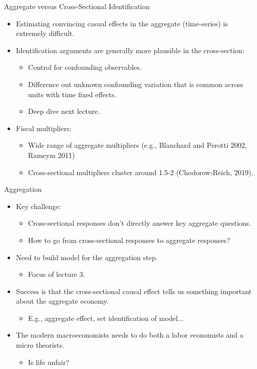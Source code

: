 \documentclass[english,xcolor=svgnames]{beamer}
\begin{document}
\begin{frame}{Aggregate versus Cross-Sectional Identification}
\begin{itemize}
\item Estimating convincing casual effects in the aggregate (time-series) is extremely difficult.
\item Identification arguments are generally more plausible in the cross-section:
\begin{itemize}
	\item Control for confounding observables.
	\item Difference out unknown confounding variation that is common across units with time fixed effects.
	\item Deep dive next lecture.
\end{itemize}
\item Fiscal multipliers:
\begin{itemize}
	\item Wide range of aggregate multipliers (e.g., Blanchard and Perotti 2002, Rameym 2011) 
	\item Cross-sectional multipliers cluster around 1.5-2 (Chodorow-Reich, 2019).
\end{itemize}
\end{itemize}
\end{frame}


\begin{frame}{Aggregation}
\begin{itemize}
\item Key challenge:
\begin{itemize}
\item Cross-sectional responses don't directly answer key aggregate questions.
\item How to go from cross-sectional responses to aggregate responses?
\end{itemize}
\item Need to build model for the aggregation step.
\begin{itemize}
	\item Focus of lecture 3.
\end{itemize}
\item Success is that the cross-sectional causal effect tells us something important about the aggregate economy.
\begin{itemize}
	\item E.g., aggregate effect, set identification of model...
\end{itemize}
\item The modern macroeconomists needs to do both a labor economists and a micro theorists.
\begin{itemize}
	\item Is life unfair?
\end{itemize}
\end{itemize}
\end{frame}
\end{document}
